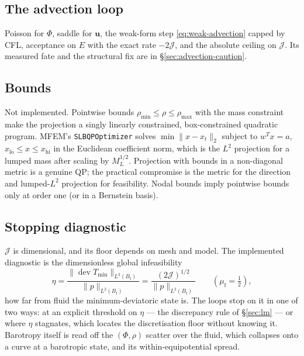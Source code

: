 \documentclass[11pt]{article}
\newcommand{\Jf}{\mathscr{J}}  %
\newcommand{\Bf}{B_{\mathrm{f}}}
\newcommand{\bu}{\mathbf{u}}
\newcommand{\dev}{\operatorname{dev}}
\newcommand{\norm}[1]{\lVert #1 \rVert}
\begin{document}
\subsection{The advection loop}

Poisson for $\Phi$, saddle for $\bu$, the weak-form step
\eqref{eq:weak-advection} capped by CFL, acceptance on $E$ with the exact
rate $-2\Jf $, and the absolute ceiling on $\Jf $. Its measured fate and the
structural fix are in \S\ref{sec:advection-caution}.

\subsection{Bounds}

Not implemented. Pointwise bounds $\rho_{\min}\le\rho\le\rho_{\max}$ with
the mass constraint make the projection a singly linearly constrained,
box-constrained quadratic program. MFEM's \texttt{SLBQPOptimizer} solves
$\min\norm{x - x_t}_2$ subject to $w^Tx = a$, $x_{\mathrm{lo}}\le x\le
x_{\mathrm{hi}}$ in the Euclidean coefficient norm, which is the $L^2$
projection for a lumped mass after scaling by $M_L^{1/2}$. Projection with
bounds in a non-diagonal metric is a genuine QP; the practical compromise
is the metric for the direction and lumped-$L^2$ projection for
feasibility. Nodal bounds imply pointwise bounds only at order one (or in
a Bernstein basis).

\subsection{Stopping diagnostic}
\label{sec:stopping}

$\Jf $ is dimensional, and its floor depends on mesh and model. The
implemented diagnostic is the dimensionless global infeasibility
\begin{equation}
  \eta = \frac{\norm{\dev T_{\min}}_{L^2(\Bf)}}{\norm{p}_{L^2(\Bf)}}
       = \frac{(2\Jf )^{1/2}}{\norm{p}_{L^2(\Bf)}}
  \qquad(\mu_{\mathrm{f}} = \tfrac12),
  \label{eq:eta}
\end{equation}
how far from fluid the minimum-deviatoric state is. The loops stop on
it in one of two ways: at an explicit threshold on $\eta$ --- the
discrepancy rule of \S\ref{sec:lm} --- or where $\eta$ stagnates, which
locates the discretisation floor without knowing it. Barotropy itself is
read off the $(\Phi,\rho)$ scatter over the fluid, which collapses onto a
curve at a barotropic state, and its within-equipotential spread.
\end{document}
